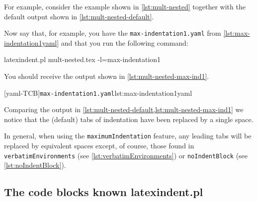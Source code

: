  \begin{example}
 For example, consider the example shown in \cref{lst:mult-nested} together with the
 default output shown in \cref{lst:mult-nested-default}.

 \begin{cmhtcbraster}[raster column skip=.1\linewidth]
 \end{cmhtcbraster}
 \end{example}

 \begin{example}
 Now say that, for example, you have the \texttt{max-indentation1.yaml} from
 \cref{lst:max-indentation1yaml} and that you run the following command:

 \begin{commandshell}
latexindent.pl mult-nested.tex -l=max-indentation1
\end{commandshell}

 You should receive the output shown in \cref{lst:mult-nested-max-ind1}.

 \begin{cmhtcbraster}
  [yaml-TCB]{\texttt{max-indentation1.yaml}}{lst:max-indentation1yaml}
 \end{cmhtcbraster}
 \end{example}

 Comparing the output in \cref{lst:mult-nested-default,lst:mult-nested-max-ind1} we
 notice that the (default) tabs of indentation have been replaced by a single space.

 In general, when using the \texttt{maximumIndentation} feature, any leading tabs will be
 replaced by equivalent spaces except, of course, those found in
 \texttt{verbatimEnvironments} (see \vref{lst:verbatimEnvironments}) or
 \texttt{noIndentBlock} (see \vref{lst:noIndentBlock}).

\subsection{The code blocks known latexindent.pl}\label{subsubsec:code-blocks}

